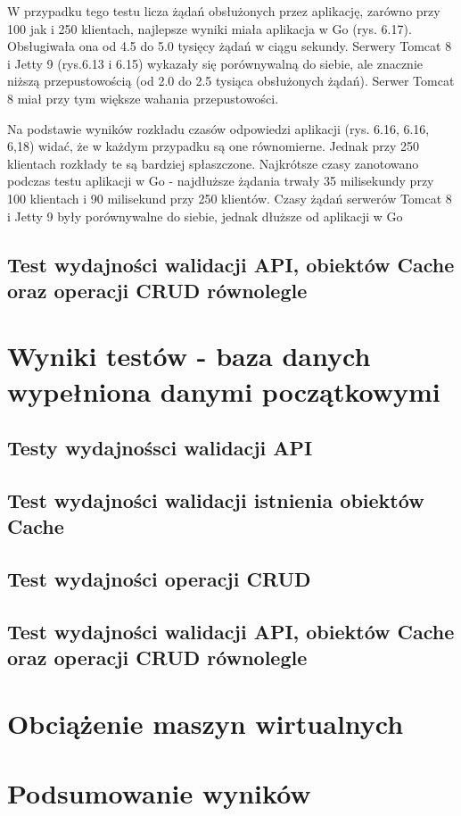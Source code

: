 W przypadku tego testu licza żądań obsłużonych przez aplikację, zarówno przy 100 jak i 250 klientach, najlepsze wyniki miała aplikacja w Go (rys. 6.17). Obsługiwała ona od 4.5 do 5.0 tysięcy żądań w ciągu sekundy. Serwery Tomcat 8 i Jetty 9 (rys.6.13 i 6.15) wykazały się porównywalną do siebie, ale znacznie niższą przepustowością (od 2.0 do 2.5 tysiąca obsłużonych żądań). Serwer Tomcat 8 miał przy tym  większe wahania przepustowości.  

Na podstawie wyników rozkładu czasów odpowiedzi aplikacji (rys. 6.16, 6.16, 6,18)  widać,  że w każdym przypadku są one równomierne. Jednak przy 250 klientach rozkłady te są bardziej spłaszczone. Najkrótsze czasy zanotowano podczas testu aplikacji w Go - najdłuższe  żądania trwały 35 milisekundy przy 100 klientach i 90 milisekund przy 250 klientów. Czasy żądań serwerów Tomcat 8 i Jetty 9 były porównywalne do siebie, jednak dłuższe od aplikacji w Go


\clearpage

\subsection{Test wydajności walidacji API, obiektów Cache oraz operacji CRUD równolegle}

\clearpage

\newpage
\section{Wyniki testów - baza danych wypełniona danymi początkowymi}
\subsection{Testy wydajnośsci walidacji API}
% 
\clearpage

\subsection{Test wydajności walidacji istnienia obiektów Cache}
% 
\clearpage

\subsection{Test wydajności operacji CRUD}
% 
\clearpage

\subsection{Test wydajności walidacji API, obiektów Cache oraz operacji CRUD równolegle }
% 
\clearpage

\section{Obciążenie maszyn wirtualnych}

\newpage
\section{Podsumowanie wyników}
